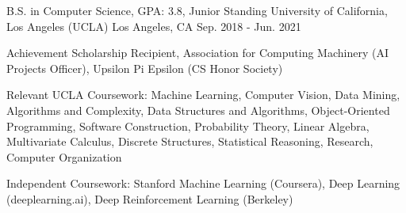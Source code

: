 

\begin{cventries}

  \cventry
    {B.S. in Computer Science, GPA: 3.8, Junior Standing} %
    {University of California, Los Angeles (UCLA)} %
    {Los Angeles, CA} %
    {Sep. 2018 - Jun. 2021} %
    {
      \begin{cvitems} %
        \item {Achievement Scholarship Recipient, Association for Computing Machinery
        (AI Projects Officer), Upsilon Pi Epsilon (CS Honor Society)}
        \item {Relevant UCLA Coursework: Machine Learning, Computer Vision, Data Mining,
        Algorithms and Complexity, Data Structures and Algorithms, Object-Oriented 
        Programming, Software Construction, Probability Theory, Linear Algebra, 
        Multivariate Calculus, Discrete Structures, Statistical Reasoning, 
        Research, Computer Organization}
        \item {Independent Coursework: Stanford Machine Learning (Coursera), Deep Learning (deeplearning.ai), Deep Reinforcement Learning (Berkeley)}
      \end{cvitems}
    }

\end{cventries}
